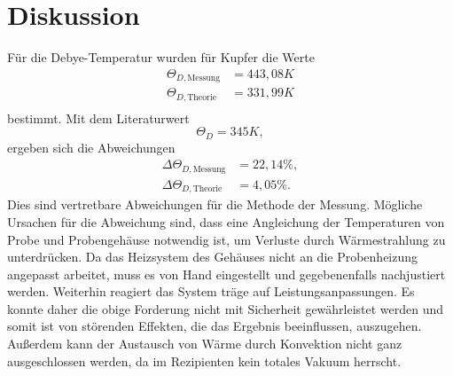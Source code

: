 \section{Diskussion}
\label{sec:Diskussion}
Für die Debye-Temperatur wurden für Kupfer die Werte
\begin{align*}
    \Theta_{D, \text{Messung}} &= 443,08K \\
    \Theta_{D, \text{Theorie}} &= 331,99K \\
\end{align*}
bestimmt.
Mit dem Literaturwert \cite{Lit}
\begin{equation*}
    \Theta_D = 345K,
\end{equation*}
ergeben sich die Abweichungen
\begin{align*}
    \Delta\Theta_{D, \text{Messung}} &= 22,14\%, \\
    \Delta\Theta_{D, \text{Theorie}} &= 4,05 \%.
\end{align*}
Dies sind vertretbare Abweichungen für die Methode der Messung.
Mögliche Ursachen für die Abweichung sind,
dass eine Angleichung der Temperaturen von Probe und Probengehäuse notwendig ist, 
um Verluste durch Wärmestrahlung zu unterdrücken. 
Da das Heizsystem des Gehäuses nicht an die Probenheizung angepasst arbeitet, 
muss es von Hand eingestellt und gegebenenfalls nachjustiert werden. 
Weiterhin reagiert das System träge auf Leistungsanpassungen. 
Es konnte daher die obige Forderung nicht mit Sicherheit gewährleistet werden und somit ist von störenden Effekten, 
die das Ergebnis beeinflussen, 
auszugehen. 
Außerdem kann der Austausch von Wärme durch Konvektion nicht ganz ausgeschlossen werden, 
da im Rezipienten kein totales Vakuum herrscht.